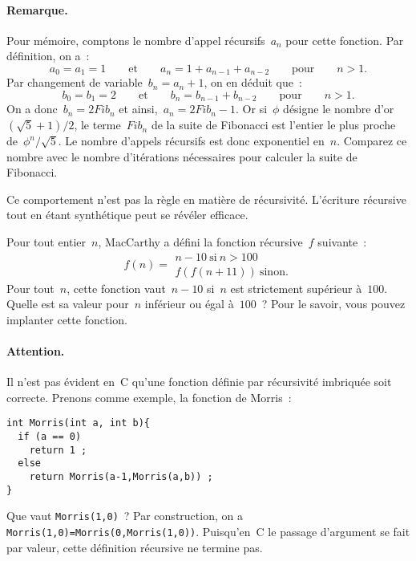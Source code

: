 \begin{exercice}
\paragraph{Remarque.}
Pour m\'emoire,  comptons  le nombre d'appel  r\'ecursifs~$a_{n}$ pour
cette fonction.  Par d\'efinition, on a~:
$$
{a_{0}=a_{1}=1}\qquad   \mathrm{et}\qquad {a_{n}=1+a_{n-1}+a_{n-2}}
\qquad  \mathrm{pour}\qquad {n>1}.
$$
Par changement de variable~${b_{n}=a_{n}+1}$, on en d\'eduit que~:
$$
{b_{0}=b_{1}=2}\qquad   \mathrm{et}\qquad {b_{n}=b_{n-1}+b_{n-2}}
\qquad  \mathrm{pour}\qquad {n>1}.
$$
On  a  donc~$b_{n}=2Fib_{n}$  et  ainsi,~$a_{n}=2Fib_{n}-1$.   Or
si~$\phi$  d\'esigne   le nombre  d'or~${(\sqrt{5}+1)/2}$,          le
terme~$Fib_{n}$ de  la suite de Fibonacci  est l'entier le plus proche
de~${\phi^{n}/\sqrt{5}}$.   Le  nombre  d'appels r\'ecursifs est  donc
exponentiel en~$n$.  Comparez ce  nombre avec le nombre d'it\'erations
n\'ecessaires pour calculer la suite de Fibonacci.
\par
Ce comportement n'est pas la r\`egle  en mati\`ere de r\'ecursivit\'e. 
L'\'ecriture   r\'ecursive  tout  en  \'etant  synth\'etique   peut se
r\'ev\'eler efficace.
\end{exercice}
\begin{exercice}
  Pour    tout  entier~$n$,     MacCarthy  a  d\'efini  la    fonction
  r\'ecursive~$f$ suivante~:
  $$
  f(n) = 
  \begin{array}{l}
    n - 10\ \mathrm{si}\ n> 100 \\
    f(f(n+11))\ \mathrm{sinon}.
  \end{array}
  $$
  Pour  tout~$n$,     cette fonction   vaut~${n-10}$  si~$n$   est
  strictement sup\'erieur  \`a~$100$.  Quelle  est sa valeur  pour~$n$
  inf\'erieur  ou   \'egal \`a~$100$~?  Pour   le  savoir, vous pouvez
  implanter cette fonction.%
  \ifcorrection
  \begin{correction}
    
  \end{correction}
  \fi
\paragraph{Attention.}
Il     n'est pas   \'evident  en~C  qu'une    fonction d\'efinie   par
r\'ecursivit\'e imbriqu\'ee soit  correcte. Prenons  comme exemple, la
fonction de Morris~:
\begin{verbatim}
int Morris(int a, int b){
  if (a == 0)
    return 1 ;
  else 
    return Morris(a-1,Morris(a,b)) ;
}
\end{verbatim}
Que   vaut    \texttt{Morris(1,0)}~?     Par    construction,  on    a
\texttt{Morris(1,0)=Morris(0,Morris(1,0))}.  Puisqu'en~C  le  passage
  d'argument se fait  par  valeur, cette d\'efinition  r\'ecursive  ne
  termine pas.
\end{exercice}
